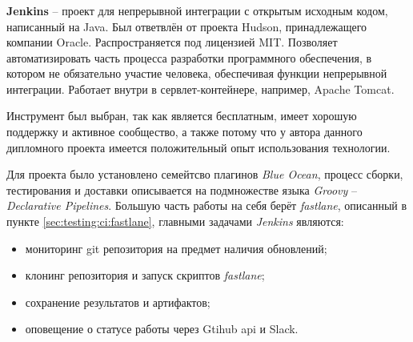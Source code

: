 \subsubsection{}
\label{sec:testing:ci:jenkins}

\textbf{Jenkins} -- проект для непрерывной интеграции с открытым исходным кодом, написанный на Java. Был ответвлён от проекта Hudson, принадлежащего компании Oracle. Распространяется под лицензией MIT. Позволяет автоматизировать часть процесса разработки программного обеспечения, в котором не обязательно участие человека, обеспечивая функции непрерывной интеграции. Работает внутри в сервлет-контейнере, например, Apache Tomcat\cite{wiki:jenkins}.

Инструмент был выбран, так как является бесплатным, имеет хорошую поддержку и активное сообщество, а также потому что у автора данного дипломного проекта имеется положительный опыт использования технологии.

Для проекта было установлено семейтсво плагинов \textit{Blue Ocean}, процесс сборки, тестирования и доставки описывается на подмножестве языка \textit{Groovy} -- \textit{Declarative Pipelines}. Большую часть работы на себя берёт \textit{fastlane}, описанный в пункте \ref{sec:testing:ci:fastlane}, главными задачами \textit{Jenkins} являются:

\begin{itemize}
	\item мониторинг git репозитория на предмет наличия обновлений;
	\item клонинг репозитория и запуск скриптов \textit{fastlane};
	\item сохранение результатов и артифактов;
	\item оповещение о статусе работы через Gtihub \gls{api} и Slack.
\end{itemize}